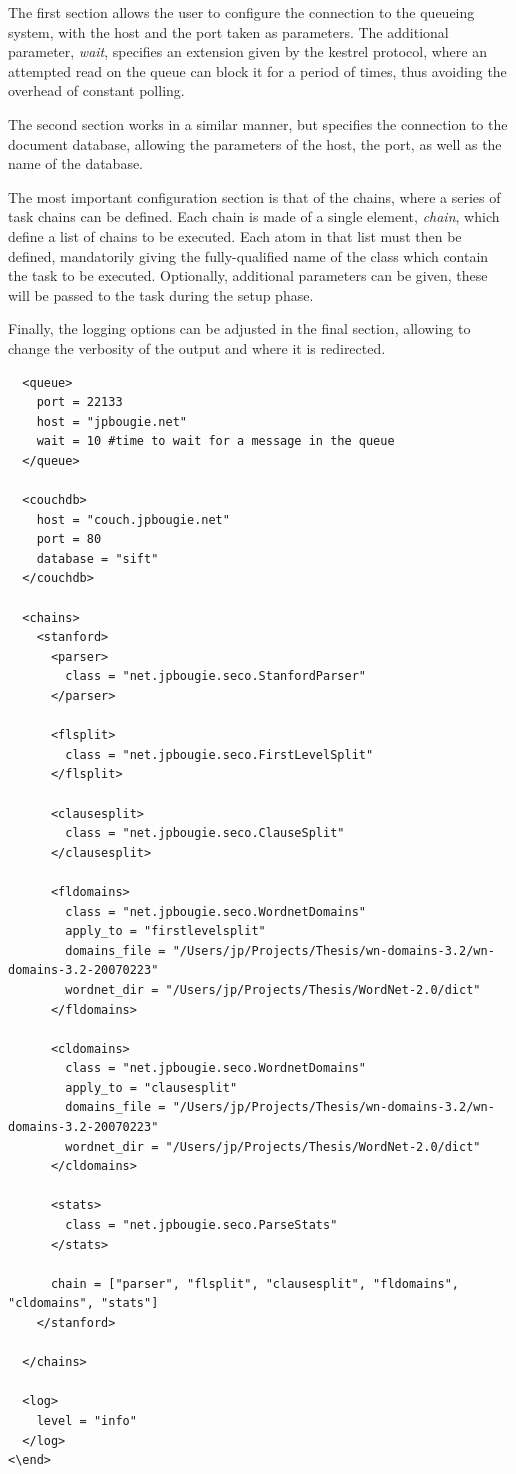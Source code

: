 The first section allows the user to configure the connection to the queueing system, with the host and the port taken as parameters. The additional parameter, \emph{wait}, specifies an extension given by the kestrel protocol, where an attempted read on the queue can block it for a period of times, thus avoiding the overhead of constant polling.

The second section works in a similar manner, but specifies the connection to the document database, allowing the parameters of the host, the port, as well as the name of the database.

The most important configuration section is that of the chains, where a series of task chains can be defined. Each chain is made of a single element, \emph{chain}, which define a list of chains to be executed. Each atom in that list must then be defined, mandatorily giving the fully-qualified name of the class which contain the task to be executed. Optionally, additional parameters can be given, these will be passed to the task during the setup phase.

Finally, the logging options can be adjusted in the final section, allowing to change the verbosity of the output and where it is redirected.

\begin{verbatim}
  <queue>
    port = 22133
    host = "jpbougie.net"
    wait = 10 #time to wait for a message in the queue
  </queue>

  <couchdb>
    host = "couch.jpbougie.net"
    port = 80
    database = "sift"
  </couchdb>

  <chains>
    <stanford>
      <parser>
        class = "net.jpbougie.seco.StanfordParser"
      </parser>

      <flsplit>
        class = "net.jpbougie.seco.FirstLevelSplit"
      </flsplit>

      <clausesplit>
        class = "net.jpbougie.seco.ClauseSplit"
      </clausesplit>

      <fldomains>
        class = "net.jpbougie.seco.WordnetDomains"
        apply_to = "firstlevelsplit"
        domains_file = "/Users/jp/Projects/Thesis/wn-domains-3.2/wn-domains-3.2-20070223"
        wordnet_dir = "/Users/jp/Projects/Thesis/WordNet-2.0/dict"
      </fldomains>

      <cldomains>
        class = "net.jpbougie.seco.WordnetDomains"
        apply_to = "clausesplit"
        domains_file = "/Users/jp/Projects/Thesis/wn-domains-3.2/wn-domains-3.2-20070223"
        wordnet_dir = "/Users/jp/Projects/Thesis/WordNet-2.0/dict"
      </cldomains>

      <stats>
        class = "net.jpbougie.seco.ParseStats"
      </stats>

      chain = ["parser", "flsplit", "clausesplit", "fldomains", "cldomains", "stats"]
    </stanford>

  </chains>

  <log>
    level = "info"
  </log>
<\end>

\end{verbatim}

